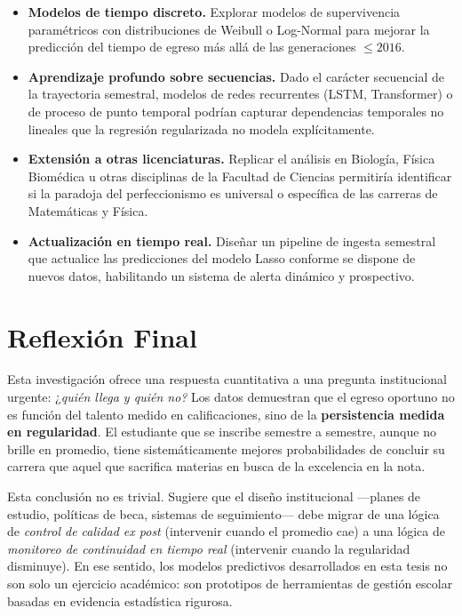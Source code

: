 \begin{itemize}
    \item \textbf{Modelos de tiempo discreto.} Explorar modelos de supervivencia paramétricos
          con distribuciones de Weibull o Log-Normal para mejorar la predicción del tiempo
          de egreso más allá de las generaciones $\leq 2016$.

    \item \textbf{Aprendizaje profundo sobre secuencias.} Dado el carácter secuencial de la
          trayectoria semestral, modelos de redes recurrentes (LSTM, Transformer) o de
          proceso de punto temporal podrían capturar dependencias temporales no lineales que
          la regresión regularizada no modela explícitamente.

    \item \textbf{Extensión a otras licenciaturas.} Replicar el análisis en Biología, Física
          Biomédica u otras disciplinas de la Facultad de Ciencias permitiría identificar
          si la paradoja del perfeccionismo es universal o específica de las carreras
          de Matemáticas y Física.

    \item \textbf{Actualización en tiempo real.} Diseñar un pipeline de ingesta semestral
          que actualice las predicciones del modelo Lasso conforme se dispone de nuevos
          datos, habilitando un sistema de alerta dinámico y prospectivo.
\end{itemize}

\section{Reflexión Final}

Esta investigación ofrece una respuesta cuantitativa a una pregunta institucional urgente:
¿\emph{quién llega y quién no?} Los datos demuestran que el egreso oportuno no es función
del talento medido en calificaciones, sino de la \textbf{persistencia medida en regularidad}.
El estudiante que se inscribe semestre a semestre, aunque no brille en promedio, tiene
sistemáticamente mejores probabilidades de concluir su carrera que aquel que sacrifica
materias en busca de la excelencia en la nota.

Esta conclusión no es trivial. Sugiere que el diseño institucional —planes de estudio,
políticas de beca, sistemas de seguimiento— debe migrar de una lógica de \emph{control de
calidad ex post} (intervenir cuando el promedio cae) a una lógica de \emph{monitoreo de
continuidad en tiempo real} (intervenir cuando la regularidad disminuye). En ese sentido,
los modelos predictivos desarrollados en esta tesis no son solo un ejercicio académico:
son prototipos de herramientas de gestión escolar basadas en evidencia estadística rigurosa.
